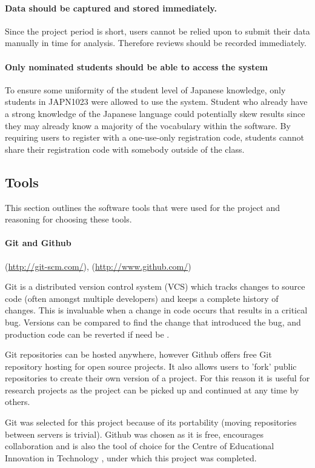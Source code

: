 \paragraph{Data should be captured and stored immediately.} Since the project period is short,
users cannot be relied upon to submit their data manually in time for analysis. Therefore reviews
should be recorded immediately.

\paragraph{Only nominated students should be able to access the system} To ensure some uniformity
of the student level of Japanese knowledge, only students in JAPN1023 were allowed to use the
system. Student who already have a strong knowledge of the Japanese language could potentially
skew results since they may already know a majority of the vocabulary within the software.
By requiring users to register with a one-use-only registration code, students cannot share
their registration code with somebody outside of the class.

\subsection{Tools}
This section outlines the software tools that were used for the project and reasoning for
choosing these tools.
\paragraph{Git and Github}
(\url{http://git-scm.com/}),
(\url{http://www.github.com/})

Git is a distributed version control system (VCS) which tracks changes
to source code (often amongst multiple developers) and keeps a complete history
of changes. This is invaluable when a change in code occurs that results in a critical
bug. Versions can be compared to find the change that introduced the bug, and production
code can be reverted if need be \cite{scott_chacon_pro_2009}.

Git repositories can be hosted anywhere, however Github offers free Git repository hosting
for open source projects. It also allows
users to 'fork' public repositories to create their own version of a project. For this
reason it is useful for research projects as the project can be picked up and continued
at any time by others.

Git was selected for this project because of its portability (moving repositories
between servers is trivial). Github was chosen as it is free, encourages collaboration and is also the tool of choice for the 
Centre of Educational Innovation in Technology \cite{zornig_ceit_2012}, under which this project was completed. 

